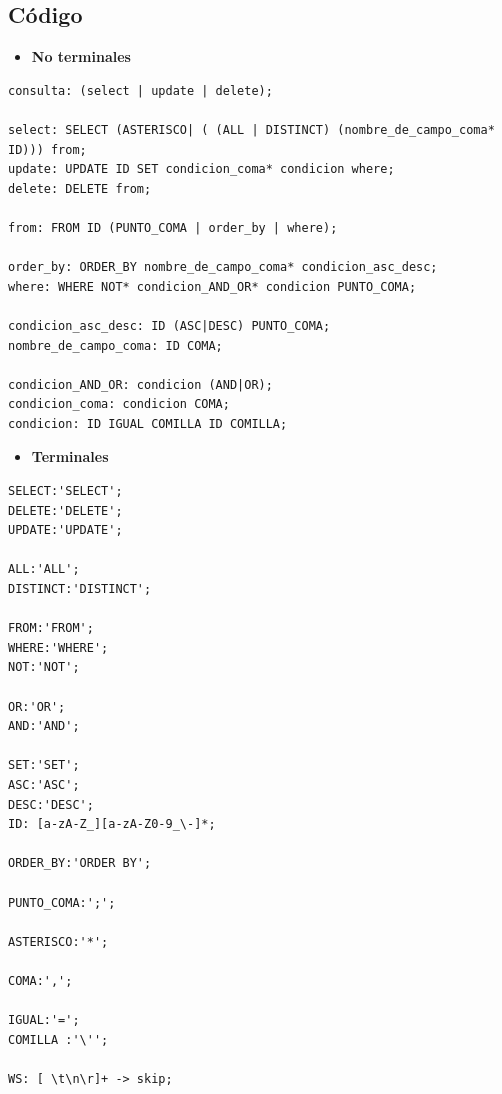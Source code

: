 \documentclass[a4paper,openright,14pt]{report}
\begin{document}
\subsection{C\'odigo}
\begin{itemize}
\item \textbf{No terminales}
\end{itemize}
\begin{lstlisting}
consulta: (select | update | delete);

select: SELECT (ASTERISCO| ( (ALL | DISTINCT) (nombre_de_campo_coma* ID))) from;
update: UPDATE ID SET condicion_coma* condicion where;
delete: DELETE from;

from: FROM ID (PUNTO_COMA | order_by | where);

order_by: ORDER_BY nombre_de_campo_coma* condicion_asc_desc; 
where: WHERE NOT* condicion_AND_OR* condicion PUNTO_COMA;

condicion_asc_desc: ID (ASC|DESC) PUNTO_COMA;
nombre_de_campo_coma: ID COMA;

condicion_AND_OR: condicion (AND|OR);
condicion_coma: condicion COMA;
condicion: ID IGUAL COMILLA ID COMILLA;
\end{lstlisting}
\begin{itemize}
\item \textbf{Terminales}
\end{itemize}
\begin{lstlisting}
SELECT:'SELECT';
DELETE:'DELETE';
UPDATE:'UPDATE';

ALL:'ALL';
DISTINCT:'DISTINCT';

FROM:'FROM';
WHERE:'WHERE';
NOT:'NOT';

OR:'OR';
AND:'AND';

SET:'SET';
ASC:'ASC';
DESC:'DESC';
ID: [a-zA-Z_][a-zA-Z0-9_\-]*;

ORDER_BY:'ORDER BY';

PUNTO_COMA:';';

ASTERISCO:'*';

COMA:',';

IGUAL:'=';
COMILLA :'\'';

WS: [ \t\n\r]+ -> skip;
\end{lstlisting}
\end{document}
